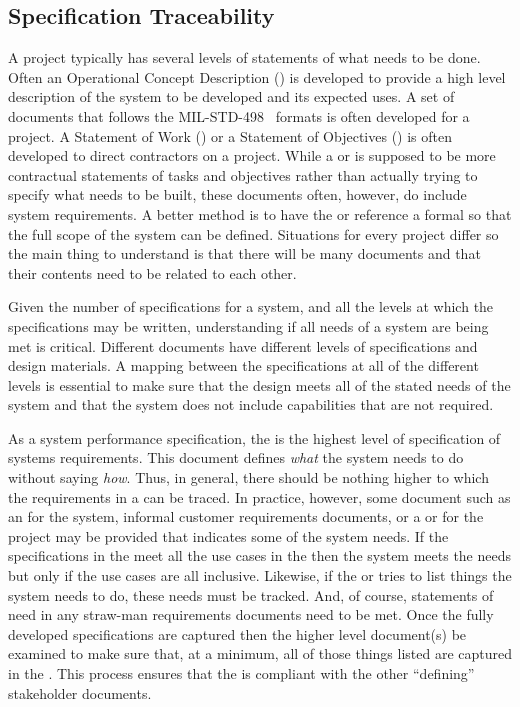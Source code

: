 \subsection{Specification Traceability}
\label{ssec:Intro_SpecTrace}%

A project typically has several levels of statements of what needs to be done.
Often an Operational Concept Description (\OCD) is developed to provide a high level description of the system to be developed and its expected uses.
A set of documents that follows the MIL-STD-498~\cite{ref__MIL_STD_498} \DID formats is often developed for a project.
A Statement of Work (\SOW) or a Statement of Objectives (\SOO) is often developed to direct contractors on a project.
While a \SOW or \SOO is supposed to be more contractual statements of tasks and objectives rather than actually trying to specify what needs to be built, these documents often, however, do include system requirements.
A better method is to have the \SOW or \SOO reference a formal \SPS so that the full scope of the system can be defined.
Situations for every project differ so the main thing to understand is that there will be many documents and that their contents need to be related to each other.


Given the number of specifications for a system, and all the levels at which the specifications may be written, understanding if all needs of a system are being met is critical.
Different documents have different levels of specifications and design materials.
A mapping between the specifications at all of the different levels is essential to make sure that the design meets all of the stated needs of the system and that the system does not include capabilities that are not required.


As a system performance specification, the \SPS is the highest level of specification of systems requirements.
This document defines {\em what} the system needs to do without saying {\em how}.
Thus, in general, there should be nothing higher to which the requirements in a \SPS can be traced.
In practice, however, some document such as an \OCD for the system, informal customer requirements documents, or a \SOW or \SOO for the project may be provided that indicates some of the system needs.
If the specifications in the \SPS meet all the use cases in the \OCD then the system meets the needs but only if the use cases are all inclusive.
Likewise, if the \SOW or \SOO tries to list things the system needs to do, these needs must be tracked.
And, of course, statements of need in any straw-man requirements documents need to be met.
Once the fully developed \SPS specifications are captured then the higher level document(s) be examined to make sure that, at a minimum, all of those things listed are captured in the \SPS.
This process ensures that the \SPS is compliant with the other ``defining'' stakeholder documents.


